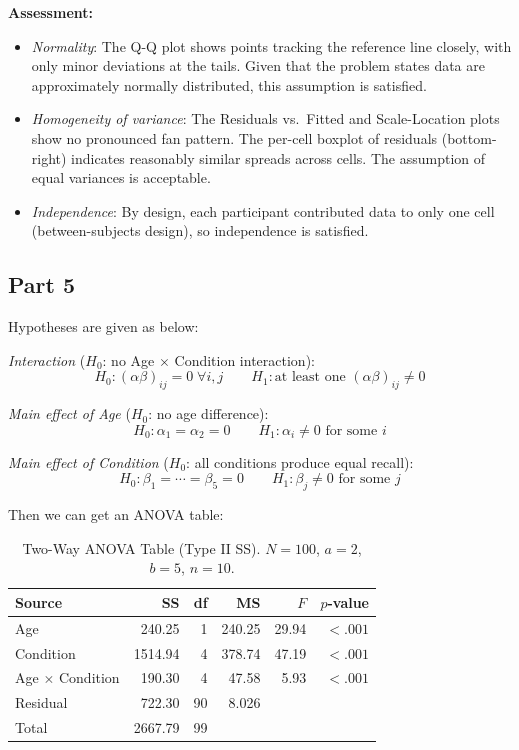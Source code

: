 \documentclass[letterpaper]{article}
\begin{document}
	\noindent\textbf{Assessment:}
	\begin{itemize}
		\item \textit{Normality}: The Q-Q plot shows points tracking the reference line closely, with only minor deviations at the tails. Given that the problem states data are approximately normally distributed, this assumption is satisfied.
		\item \textit{Homogeneity of variance}: The Residuals vs.\ Fitted and Scale-Location plots show no pronounced fan pattern. The per-cell boxplot of residuals (bottom-right) indicates reasonably similar spreads across cells. The assumption of equal variances is acceptable.
		\item \textit{Independence}: By design, each participant contributed data to only one cell (between-subjects design), so independence is satisfied.
	\end{itemize}
	
	\subsection{Part 5}
	
	Hypotheses are given as below:
	
	\noindent\textit{Interaction} ($H_0$: no Age $\times$ Condition interaction):
	\[
	H_0: (\alpha\beta)_{ij} = 0 \; \forall i,j \qquad H_1: \text{at least one } (\alpha\beta)_{ij} \neq 0
	\]
	
	\noindent\textit{Main effect of Age} ($H_0$: no age difference):
	\[
	H_0: \alpha_1 = \alpha_2 = 0 \qquad H_1: \alpha_i \neq 0 \text{ for some } i
	\]
	
	\noindent\textit{Main effect of Condition} ($H_0$: all conditions produce equal recall):
	\[
	H_0: \beta_1 = \cdots = \beta_5 = 0 \qquad H_1: \beta_j \neq 0 \text{ for some } j
	\]
	
	Then we can get an ANOVA table:
	
	\begin{table}[H]
		\centering
		\begin{tabular}{lrrrrr}
			\toprule
			Source & SS & df & MS & $F$ & $p$-value \\
			\midrule
			Age                    & 240.25  & 1  & 240.25  & 29.94 & $< .001$ \\
			Condition              & 1514.94 & 4  & 378.74  & 47.19 & $< .001$ \\
			Age $\times$ Condition & 190.30  & 4  & 47.58   & 5.93  & $< .001$ \\
			Residual               & 722.30  & 90 & 8.026   &       &          \\
			\midrule
			Total                  & 2667.79 & 99 &         &       &          \\
			\bottomrule
		\end{tabular}
		\caption{Two-Way ANOVA Table (Type II SS). $N = 100$, $a = 2$, $b = 5$, $n = 10$.}
		\label{tab:anova}
	\end{table}
	
\end{document}
